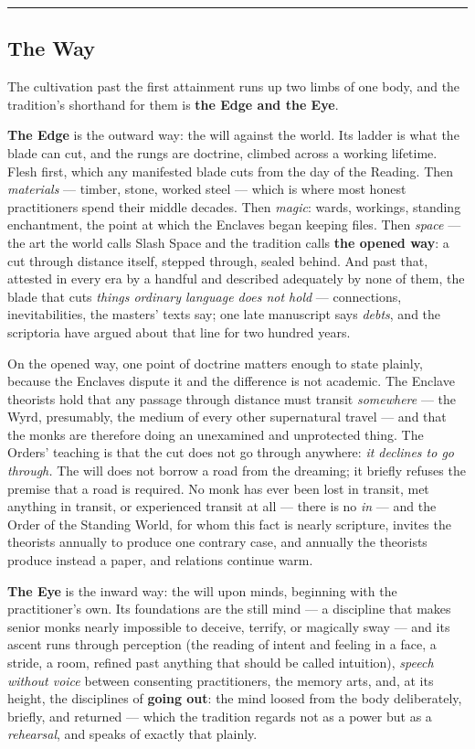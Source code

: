 \medskip\hrule\medskip

\subsection{The Way}

The cultivation past the first attainment runs up two limbs of one body, and the tradition's shorthand for them is \textbf{the Edge and the Eye}.

\textbf{The Edge} is the outward way: the will against the world. Its ladder is what the blade can cut, and the rungs are doctrine, climbed across a working lifetime. Flesh first, which any manifested blade cuts from the day of the Reading. Then \textit{materials} --- timber, stone, worked steel --- which is where most honest practitioners spend their middle decades. Then \textit{magic}: wards, workings, standing enchantment, the point at which the Enclaves began keeping files. Then \textit{space} --- the art the world calls Slash Space and the tradition calls \textbf{the opened way}: a cut through distance itself, stepped through, sealed behind. And past that, attested in every era by a handful and described adequately by none of them, the blade that cuts \textit{things ordinary language does not hold} --- connections, inevitabilities, the masters' texts say; one late manuscript says \textit{debts}, and the scriptoria have argued about that line for two hundred years.

On the opened way, one point of doctrine matters enough to state plainly, because the Enclaves dispute it and the difference is not academic. The Enclave theorists hold that any passage through distance must transit \textit{somewhere} --- the Wyrd, presumably, the medium of every other supernatural travel --- and that the monks are therefore doing an unexamined and unprotected thing. The Orders' teaching is that the cut does not go through anywhere: \textit{it declines to go through.} The will does not borrow a road from the dreaming; it briefly refuses the premise that a road is required. No monk has ever been lost in transit, met anything in transit, or experienced transit at all --- there is no \textit{in} --- and the Order of the Standing World, for whom this fact is nearly scripture, invites the theorists annually to produce one contrary case, and annually the theorists produce instead a paper, and relations continue warm.

\textbf{The Eye} is the inward way: the will upon minds, beginning with the practitioner's own. Its foundations are the still mind --- a discipline that makes senior monks nearly impossible to deceive, terrify, or magically sway --- and its ascent runs through perception (the reading of intent and feeling in a face, a stride, a room, refined past anything that should be called intuition), \textit{speech without voice} between consenting practitioners, the memory arts, and, at its height, the disciplines of \textbf{going out}: the mind loosed from the body deliberately, briefly, and returned --- which the tradition regards not as a power but as a \textit{rehearsal}, and speaks of exactly that plainly.

